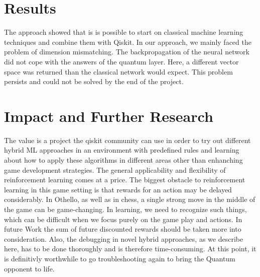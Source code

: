\documentclass[conference]{IEEEtran}
\begin{document}
\section{Results}
The approach showed that is is possible to start on classical machine learning techniques and combine them with Qiskit. In our approach, we mainly faced the problem of dimension mismatching. The backpropagation of the neural network did not cope with the answers of the quantum layer. Here, a different vector space was returned than the classical network would expect. This problem persists and could not be solved by the end of the project. \\ 


\section{Impact and Further Research}
The value is a project the qiskit community can use in order to try out different hybrid ML approaches in an environment with predefined rules and learning about how to apply these algorithms in different areas other than enhanching game development strategies. 
The general applicability and flexibility of reinforcement learning comes at a price. The biggest obstacle to reinforcement learning in this game setting is that rewards for an action may be delayed considerably. In Othello, as well as in chess, a single strong move in the middle of the game can be game-changing. In learning, we need to recognize such things, which can be difficult when we focus purely on the game play and actions. In future Work the sum of future discounted rewards should be taken more into consideration.
Also, the debugging in novel hybrid approaches, as we describe here, has to be done thoroughly and is therefore time-consuming. At this point, it is definitivly worthwhile to go troubleshooting again to bring the Quantum opponent to life.






\end{document}

